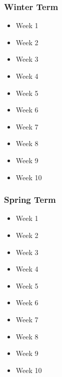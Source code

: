	\subsubsection{Winter Term}
	\begin{itemize}
		\item{Week 1}
		\item{Week 2}
		\item{Week 3}
		\item{Week 4}
		\item{Week 5}
		\item{Week 6}
		\item{Week 7}
		\item{Week 8}
		\item{Week 9}
		\item{Week 10}
	\end{itemize}

	\subsubsection{Spring Term}
	\begin{itemize}
		\item{Week 1}
		\item{Week 2}
		\item{Week 3}
		\item{Week 4}
		\item{Week 5}
		\item{Week 6}
		\item{Week 7}
		\item{Week 8}
		\item{Week 9}
		\item{Week 10}
	\end{itemize}

	\pagebreak
